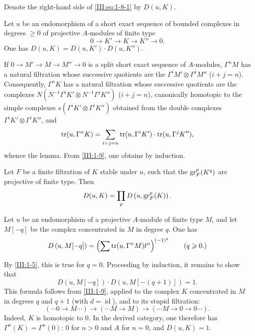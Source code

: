 Denote the right-hand side of \eqref{III:eq:1-8-1} by $D(u,K)$.






\begin{lemma_}\label{III:1-9}
Let $u$ be an endomorphism of a short exact sequence of bounded complexes in
degrees $\geqslant 0$ of projective $A$-modules of finite type
\[
  0 \to K' \to K \to K'' \to 0 \text{.}
\]
One has $D(u,K)=D(u,K')\cdot D(u,K'')$.
\end{lemma_}

If $0\to M'\to M\to M''\to 0$ is a split short exact sequence of
$A$-modules, $\Gamma^n M$ has a natural filtration whose successive quotients
are the $\Gamma^i M'\otimes \Gamma^j M''$ ($i+j=n$). Consequently,
$\Gamma^n K$ has a natural filtration whose successive quotients are the
complexes $N(N^{-1} \Gamma^i K'\otimes N^{-1}\Gamma^j K'')$ ($i+j=n$),
canonically homotopic to the simple complexes
$s(\Gamma^i K'\otimes \Gamma^i K'')$ obtained from the double complexes
$\Gamma^i K'\otimes \Gamma^i K''$, and
\[
  \operatorname{tr}(u,\Gamma^n K) = \sum_{i+j=n} \operatorname{tr}(u,\Gamma^i K')\cdot \operatorname{tr}(u,\Gamma^j K'') \text{,}
\]
whence the lemma. From \ref{III:1-9}, one obtains by induction.






\begin{lemma_}\label{III:1-10}
Let $F$ be a finite filtration of $K$ stable under $u$, such that the
$\operatorname{gr}_F^p(K^q)$ are projective of finite type. Then
\[
  D(u,K) = \prod_p D\left(u,\operatorname{gr}_F^p(K)\right) \text{.}
\]
\end{lemma_}






\begin{lemma_}\label{III:1-11}
Let $u$ be an endomorphism of a projective $A$-module of finite type $M$, and
let $M[-q]$ be the complex concentrated in $M$ in degree $q$. One has
\[
  D\left(u,M[-q]\right) = \left(\sum \operatorname{tr}(u,\Gamma^n M) t^n\right)^{(-1)^q} \qquad \text{($q\geqslant 0$.)}
\]
\end{lemma_}






By \ref{III:1-5}, this is true for $q=0$. Proceeding by induction, it remains
to show that
\[
  D\left(u,M[-q]\right) \cdot D\left(u,M[-(q+1)]\right) = 1 \text{.}
\]
This formula follows from \ref{III:1-9}, applied to the complex $K$
concentrated in $M$ in degrees $q$ and $q+1$ (with
$d=\operatorname{id}$), and to its stupid filtration:
\[
  (\cdots 0 \to M \cdots) \to (\cdots M \to M) \to (\cdots M \to 0 \to 0 \cdots) \text{.}
\]
Indeed, $K$ is homotopic to $0$. In the derived category, one therefore has
$\Gamma^n(K)=\Gamma^n(0)$: $0$ for $n>0$ and $A$ for $n=0$, and $D(u,K)=1$.






